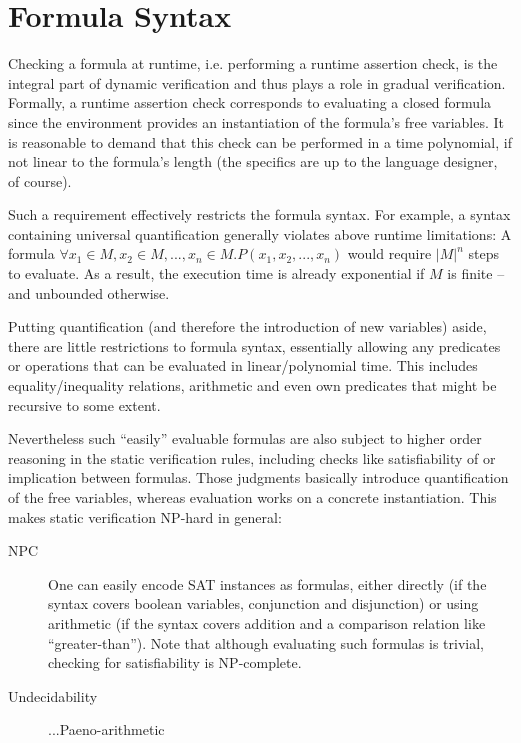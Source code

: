 \documentclass[11pt,a4paper]{article}
\begin{document}

\section{Formula Syntax}
Checking a formula at runtime, i.e. performing a runtime assertion check, is the integral part of dynamic verification and thus plays a role in gradual verification.
Formally, a runtime assertion check corresponds to evaluating a closed formula since the environment provides an instantiation of the formula's free variables.
It is reasonable to demand that this check can be performed in a time polynomial, if not linear to the formula's length (the specifics are up to the language designer, of course).

Such a requirement effectively restricts the formula syntax.
For example, a syntax containing universal quantification generally violates above runtime limitations:
A formula $\forall x_1 \in M, x_2 \in M, ..., x_n \in M. P(x_1, x_2, ..., x_n)$ would require $|M|^n$ steps to evaluate.
As a result, the execution time is already exponential if $M$ is finite -- and unbounded otherwise.

Putting quantification (and therefore the introduction of new variables) aside, there are little restrictions to formula syntax, essentially allowing any predicates or operations that can be evaluated in linear/polynomial time.
This includes equality/inequality relations, arithmetic and even own predicates that might be recursive to some extent.

Nevertheless such “easily” evaluable formulas are also subject to higher order reasoning in the static verification rules, including checks like satisfiability of or implication between formulas.
Those judgments basically introduce quantification of the free variables, whereas evaluation works on a concrete instantiation.
This makes static verification NP-hard in general:
\begin{description}
    \item[NPC] One can easily encode SAT instances as formulas, either directly (if the syntax covers boolean variables, conjunction and disjunction) or using arithmetic (if the syntax covers addition and a comparison relation like “greater-than”). Note that although evaluating such formulas is trivial, checking for satisfiability is NP-complete. %
    \item[Undecidability] ...Paeno-arithmetic %
\end{description}
\end{document}
